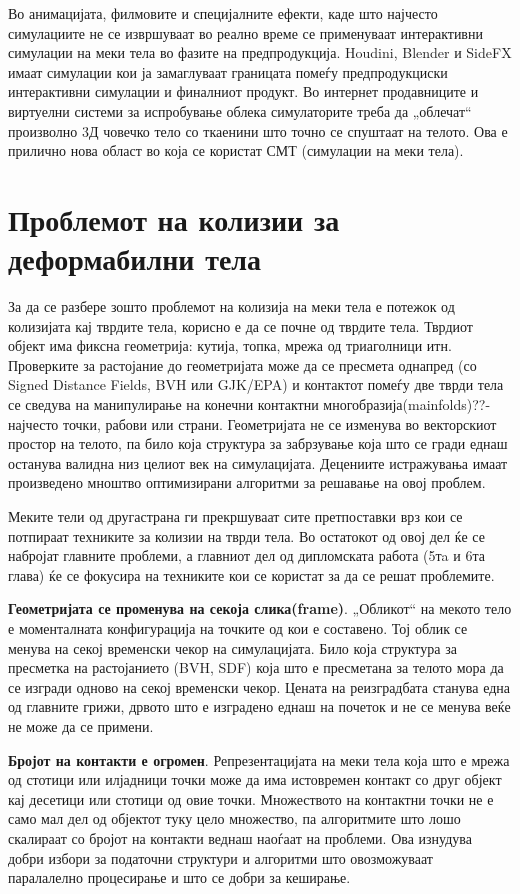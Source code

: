 Во анимацијата, филмовите и специјалните ефекти, каде што најчесто симулациите не се извршуваат во реално време се применуваат интерактивни симулации на меки тела во фазите на предпродукција. Houdini, Blender и SideFX имаат симулации кои ја замаглуваат границата помеѓу предпродукциски интерактивни симулации и финалниот продукт. Во интернет продавниците и виртуелни системи за испробување облека симулаторите треба да „облечат“ произволно 3Д човечко тело со ткаенини што точно се спуштаат на телото. Ова е прилично нова област во која се користат СМТ (симулации на меки тела).

\section{Проблемот на колизии за деформабилни тела}
За да се разбере зошто проблемот на колизија на меки тела е потежок од колизијата кај тврдите тела, корисно е да се почне од тврдите тела. Тврдиот објект има фиксна геометрија: кутија, топка, мрежа од триаголници итн. Проверките за растојание до геометријата може да се пресмета однапред (со Signed Distance Fields, BVH или GJK/EPA) и контактот помеѓу две тврди тела се сведува на манипулирање на конечни контактни многобразија(mainfolds)??- најчесто точки, рабови или страни. Геометријата не се изменува во векторскиот простор на телото, па било која структура за забрзување која што се гради еднаш останува валидна низ целиот век на симулацијата. Децениите истражувања имаат произведено мноштво оптимизирани алгоритми за решавање на овој проблем.

Меките тели од другастрана ги прекршуваат сите претпоставки врз кои се потпираат техниките за колизии на тврди тела. Во остатокот од овој дел ќе се набројат главните проблеми, а главниот дел од дипломската работа (5тa и 6та глава) ќе се фокусира на техниките кои се користат за да се решат проблемите. 

\textbf{Геометријата се променува на секоја слика(frame)}. „Обликот“ на мекото тело е моменталната конфигурација на точките од кои е составено. Тој облик се менува на секој временски чекор на симулацијата. Било која структура за пресметка на растојанието (BVH, SDF) која што е пресметана за телото мора да се изгради одново на секој временски чекор. Цената на реизградбата станува една од главните грижи, дрвото што е изградено еднаш на почеток и не се менува веќе не може да се примени.

\textbf{Бројот на контакти е огромен}. Репрезентацијата на меки тела која што е мрежа од стотици или илјадници точки може да има истовремен контакт со друг објект кај десетици или стотици од овие точки. Множеството на контактни точки не е само мал дел од објектот туку цело множество, па алгоритмите што лошо скалираат со бројот на контакти веднаш наоѓаат на проблеми. Ова изнудува добри избори за податочни структури и алгоритми што овозможуваат паралалелно процесирање и што се добри за кеширање.

